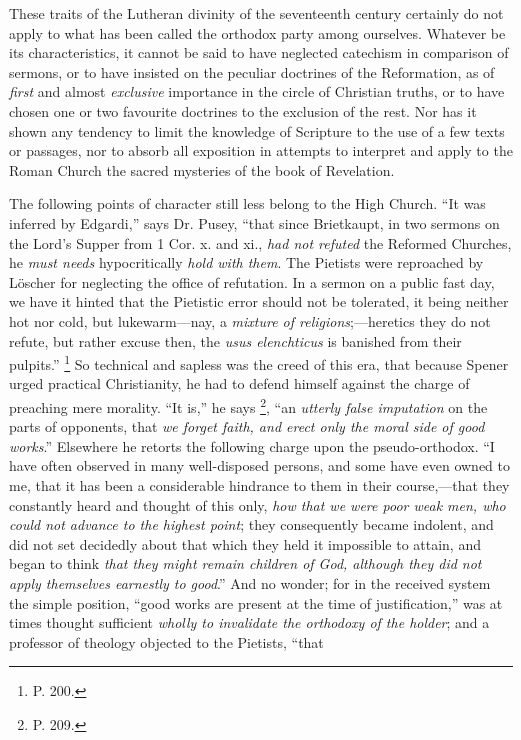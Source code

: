 These traits of the Lutheran divinity of the
seventeenth century certainly do not apply to what has been called the
orthodox party among ourselves. Whatever be its characteristics, it
cannot be said to have neglected catechism in comparison of sermons, or
to have insisted on the peculiar doctrines of the Reformation, as of \emph{first}
and almost \emph{exclusive} importance in the circle of Christian
truths, or to have chosen one or two favourite doctrines to the
exclusion of the rest. Nor has it shown any tendency to limit the
knowledge of Scripture to the use of a few texts or passages, nor to
absorb all exposition in attempts to interpret and apply to the Roman
Church the sacred mysteries of the book of Revelation.

The following points of character still less belong
to the High Church. ``It was inferred by Edgardi,'' says Dr. Pusey, ``that
since Brietkaupt, in two sermons on the Lord's Supper from 1 Cor. x. and
xi., \emph{had not refuted} the Reformed Churches, he \emph{must needs}
hypocritically \emph{hold with them}. The Pietists were reproached by Löscher
for neglecting the office of refutation. In a sermon on a public fast
day, we have it hinted that the Pietistic error should not be
tolerated, it being neither hot nor cold, but lukewarm—nay, a \emph{mixture
of religions};—heretics they do not refute, but rather excuse then,
the \emph{usus elenchticus} is banished from their pulpits.'' \footnote{P. 200.} So technical and sapless was the creed of this era, that because
Spener urged practical Christianity, he had to defend himself against
the charge of preaching mere morality. ``It is,'' he says \footnote{P. 209.}, ``an \emph{utterly false imputation} on the parts of opponents,
that \emph{we forget faith, and erect only the moral side of good works}.''
Elsewhere he retorts the following charge upon the pseudo-orthodox. ``I
have often observed in many well-disposed persons, and some have even
owned to me, that it has been a considerable hindrance to them in their
course,—that they constantly heard and thought of this only, \emph{how
that we were poor weak men, who could not advance to the highest point};
they consequently became indolent, and did not set decidedly about that
which they held it impossible to attain, and began to think \emph{that they
might remain children of God, although they did not apply themselves
earnestly to good}.'' And no wonder; for in the received system the
simple position, ``good works are present at the time of justification,''
was at times thought sufficient \emph{wholly to invalidate the orthodoxy of
the holder}; and a professor of theology objected to the Pietists, ``that
